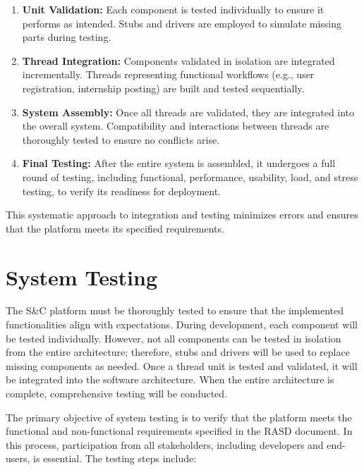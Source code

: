 \begin{enumerate}
    \item \textbf{Unit Validation:} Each component is tested individually to ensure it performs as intended. Stubs and drivers are employed to simulate missing parts during testing.
    \item \textbf{Thread Integration:} Components validated in isolation are integrated incrementally. Threads representing functional workflows (e.g., user registration, internship posting) are built and tested sequentially.
    \item \textbf{System Assembly:} Once all threads are validated, they are integrated into the overall system. Compatibility and interactions between threads are thoroughly tested to ensure no conflicts arise.
    \item \textbf{Final Testing:} After the entire system is assembled, it undergoes a full round of testing, including functional, performance, usability, load, and stress testing, to verify its readiness for deployment.
\end{enumerate}

This systematic approach to integration and testing minimizes errors and ensures that the platform meets its specified requirements.

\pagebreak
\section{System Testing\label{sec:system_testing}}

The S\&C platform must be thoroughly tested to ensure that the implemented functionalities align with expectations. During development, each component will be tested individually. However, not all components can be tested in isolation from the entire architecture; therefore, stubs and drivers will be used to replace missing components as needed. Once a thread unit is tested and validated, it will be integrated into the software architecture. When the entire architecture is complete, comprehensive testing will be conducted.

The primary objective of system testing is to verify that the platform meets the functional and non-functional requirements specified in the RASD document. In this process, participation from all stakeholders, including developers and end-users, is essential. The testing steps include:

